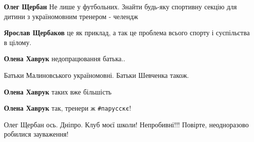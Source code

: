 \begin{itemize}
\begin{itemize}
\textbf{Олег Щербан} Не лише у футбольних. Знайти будь-яку спортивну секцію для дитини з україномовним тренером - челендж

 
\textbf{Ярослав Щербаков} це як приклад, а так це проблема всього спорту і суспільства в цілому.

 
\textbf{Олена Хаврук} недопрацювання батька..

 

Батьки Малиновського україномовні.
Батьки Шевченка також.

 
\textbf{Олена Хаврук} таких вже більшість

 
\textbf{Олена Хаврук} так, тренери ж \verb|#парусскє|!

 

\obeycr
Олег Щербан ось. Дніпро.
Клуб моєї школи!
Непробивні!!!
Повірте, неодноразово робилися зауваження!
\restorecr


\end{itemize}
\end{itemize}
